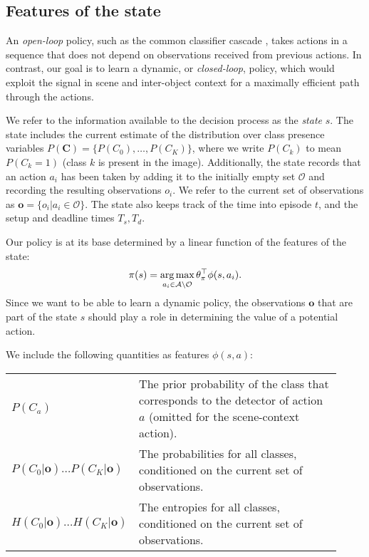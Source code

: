 \subsection{Features of the state}\label{sec:det_features}

An \emph{open-loop} policy, such as the common classifier cascade \cite{Viola2004}, takes actions in a sequence that does not depend on observations received from previous actions.
In contrast, our goal is to learn a dynamic, or \emph{closed-loop}, policy, which would exploit the signal in scene and inter-object context for a maximally efficient path through the actions.

We refer to the information available to the decision process as the \emph{state} $s$.
The state includes the current estimate of the distribution over class presence variables $P(\mathbf{C}) = \{P(C_0), \ldots, P(C_K)\}$, where we write $P(C_k)$ to mean $P(C_k=1)$ (class $k$ is present in the image).
Additionally, the state records that an action $a_i$ has been taken by adding it to the initially empty set $\mathcal{O}$ and recording the resulting observations $o_i$.
We refer to the current set of observations as $\mathbf{o} = \{o_i | a_i \in \mathcal{O}\}$.
The state also keeps track of the time into episode $t$, and the setup and deadline times $T_s,T_d$.

Our policy is at its base determined by a linear function of the features of the state:
\begin{align}
\pi(s) = \operatorname*{arg\,max}_{a_i \in \mathcal{A} \setminus \mathcal{O}} \theta_\pi^\top \phi(s,a_i).
\end{align}
Since we want to be able to learn a dynamic policy, the observations $\mathbf{o}$ that are part of the state $s$ should play a role in determining the value of a potential action.

We include the following quantities as features $\phi(s,a)$:

\begin{tabularx}{0.8\linewidth}{p{0.23\linewidth}p{0.69\linewidth}}
$P(C_a)$ & The prior probability of the class that corresponds to the detector of action $a$ (omitted for the scene-context action).\\
$P(C_0|\mathbf{o}) \ldots P(C_K|\mathbf{o})$ & The probabilities for all classes, conditioned on the current set of observations.\\
$H(C_0|\mathbf{o}) \ldots H(C_K|\mathbf{o})$ & The entropies for all classes, conditioned on the current set of observations. \\
\end{tabularx}

